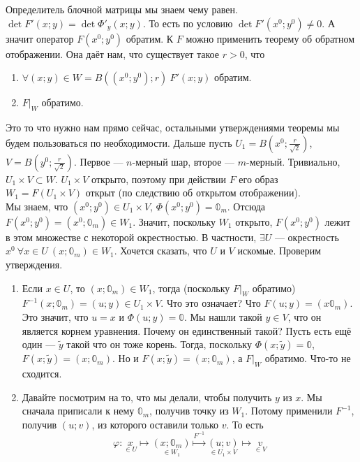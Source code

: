 \documentclass{article}
\begin{document}
\begin{itemize}
\begin{Proof}
            Определитель блочной матрицы мы знаем чему равен. $\det F'(x;y)=\det\Phi'_y(x;y)$. То есть по условию $\det F'(x^0;y^0)\neq0$. А значит оператор $F(x^0;y^0)$ обратим. К $F$ можно применить теорему об обратном отображении. Она даёт нам, что существует такое $r>0$, что
            \begin{enumerate}
                \item $\forall (x;y)\in W=B((x^0;y^0);r)~F'(x;y)$ обратим.
                \item $F\big|_W$ обратимо.
            \end{enumerate}
            Это то что нужно нам прямо сейчас, остальными утверждениями теоремы мы будем пользоваться по необходимости. Дальше пусть $U_1=B\left(x^0;\frac r{\sqrt2}\right)$, $V=B\left(y^0;\frac r{\sqrt2}\right)$. Первое --- $n$-мерный шар, второе --- $m$-мерный. Тривиально, $U_1\times V\subset W$. $U_1\times V$ открыто, поэтому при действии $F$ его образ $W_1=F(U_1\times V)$ открыт (по следствию об открытом отображении).\\
            Мы знаем, что $(x^0;y^0)\in U_1\times V$, $\Phi(x^0;y^0)=\mathbb0_m$. Отсюда $F(x^0;y^0)=(x^0;\mathbb0_m)\in W_1$. Значит, поскольку $W_1$ открыто, $F(x^0;y^0)$ лежит в этом множестве с некоторой окрестностью. В частности, $\exists U$ --- окрестность $x^0~\forall x\in U~(x;\mathbb0_m)\in W_1$. Хочется сказать, что $U$ и $V$ искомые. Проверим утверждения.\\
            \begin{enumerate}
                \item Если $x\in U$, то $(x;\mathbb0_m)\in W_1$, тогда (поскольку $F\big|_W$ обратимо) $F^{-1}(x;\mathbb0_m)=(u;y)\in U_1\times V$. Что это означает? Что $F(u;y)=(x\mathbb0_m)$. Это значит, что $u=x$ и $\Phi(u;y)=\mathbb0$. Мы нашли такой $y\in V$, что он является корнем уравнения. Почему он единственный такой? Пусть есть ещё один --- $\tilde y$ такой что он тоже корень. Тогда, поскольку $\Phi(x;\tilde y)=\mathbb0$, $F(x;\tilde y)=(x;\mathbb0_m)$. Но и $F(x;\tilde y)=(x;\mathbb0_m)$, а $F\big|_W$ обратимо. Что-то не сходится.
                \item Давайте посмотрим на то, что мы делали, чтобы получить $y$ из $x$. Мы сначала приписали к нему $\mathbb0_m$, получив точку из $W_1$. Потому применили $F^{-1}$, получив $(u;v)$, из которого оставили только $v$. То есть
                $$\varphi\colon \underset{\in U}x\longmapsto\underset{\in W_1}{(x;\mathbb0_m)}\overset{F^{-1}}\longmapsto\underset{\in U_1\times V}{(u;v)}\longmapsto\underset{\in V}{v}$$

\end{enumerate}
\end{Proof}
\end{itemize}
\end{document}
